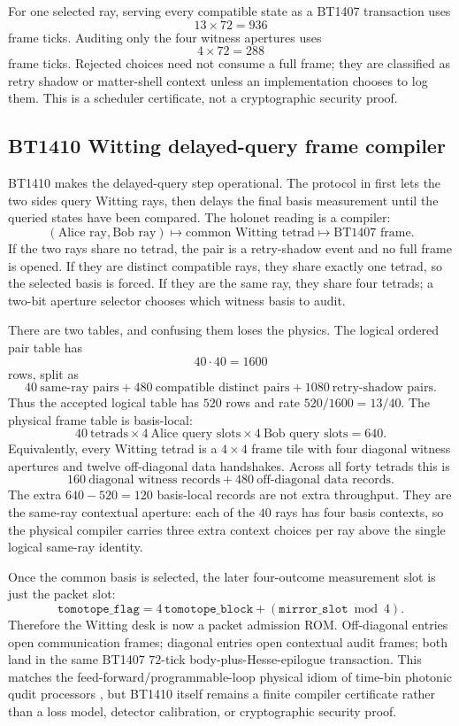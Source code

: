 \documentclass[11pt]{article}
\begin{document}
For one selected ray, serving every compatible state as a BT1407 transaction
uses
\[
  13\times72=936
\]
frame ticks.  Auditing only the four witness apertures uses
\[
  4\times72=288
\]
frame ticks.  Rejected choices need not consume a full frame; they are classified
as retry shadow or matter-shell context unless an implementation chooses to log
them.  This is a scheduler certificate, not a cryptographic security proof.

\subsection{BT1410 Witting delayed-query frame compiler}

BT1410 makes the delayed-query step operational.  The protocol in
\cite{vlasov-witting-communications} first lets the two sides query Witting
rays, then delays the final basis measurement until the queried states have been
compared.  The holonet reading is a compiler:
\[
  (\text{Alice ray},\text{Bob ray})\longmapsto
  \text{common Witting tetrad}\longmapsto
  \text{BT1407 frame}.
\]
If the two rays share no tetrad, the pair is a retry-shadow event and no full
frame is opened.  If they are distinct compatible rays, they share exactly one
tetrad, so the selected basis is forced.  If they are the same ray, they share
four tetrads; a two-bit aperture selector chooses which witness basis to audit.

There are two tables, and confusing them loses the physics.  The logical ordered
pair table has
\[
  40\cdot40=1600
\]
rows, split as
\[
  40\ \text{same-ray pairs}
  +480\ \text{compatible distinct pairs}
  +1080\ \text{retry-shadow pairs}.
\]
Thus the accepted logical table has \(520\) rows and rate \(520/1600=13/40\).
The physical frame table is basis-local:
\[
  40\ \text{tetrads}\times4\ \text{Alice query slots}
  \times4\ \text{Bob query slots}=640.
\]
Equivalently, every Witting tetrad is a \(4\times4\) frame tile with four
diagonal witness apertures and twelve off-diagonal data handshakes.  Across all
forty tetrads this is
\[
  160\ \text{diagonal witness records}
  +480\ \text{off-diagonal data records}.
\]
The extra \(640-520=120\) basis-local records are not extra throughput.  They
are the same-ray contextual aperture: each of the \(40\) rays has four basis
contexts, so the physical compiler carries three extra context choices per ray
above the single logical same-ray identity.

Once the common basis is selected, the later four-outcome measurement slot is
just the packet slot:
\[
  \texttt{tomotope\_flag}
  =
  4\,\texttt{tomotope\_block}
  +(\texttt{mirror\_slot}\bmod4).
\]
Therefore the Witting desk is now a packet admission ROM.  Off-diagonal entries
open communication frames; diagonal entries open contextual audit frames; both
land in the same BT1407 \(72\)-tick body-plus-Hesse-epilogue transaction.  This
matches the feed-forward/programmable-loop physical idiom of time-bin photonic
qudit processors \cite{delteil-timebin-qudit}, but BT1410 itself remains a
finite compiler certificate rather than a loss model, detector calibration, or
cryptographic security proof.
\end{document}
